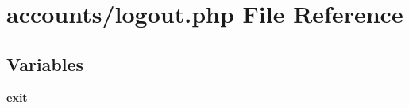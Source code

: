 \hypertarget{logout_8php}{\section{accounts/logout.php File Reference}
\label{logout_8php}
}
\subsection*{Variables}
\begin{DoxyCompactItemize}
\item 
\hypertarget{logout_8php_a6733eb5f605d09eaede9845835d71c4e}{{\bfseries exit}}\label{logout_8php_a6733eb5f605d09eaede9845835d71c4e}

\end{DoxyCompactItemize}
